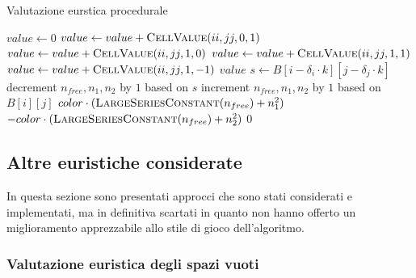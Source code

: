 \documentclass{article}
\begin{document}
\begin{algorithm}[H]
  \caption{Valutazione eurstica procedurale}
  \label{alg:eval}
  \begin{algorithmic}[0]
      \State $value \gets 0$
        \State $value \gets value + \Call{CellValue}{ii, jj, 0, 1}$
      \EndFor
        \State $value \gets value + \Call{CellValue}{ii, jj, 1, 0}$
      \EndFor
        \State $value \gets value + \Call{CellValue}{ii, jj, 1, 1}$
      \EndFor
        \State $value \gets value + \Call{CellValue}{ii, jj, 1, -1}$
      \EndFor
      \State \Return $value$
    \EndProcedure
    \Statex
       
        \State $s \gets B[i - \delta_i \cdot k][j - \delta_j \cdot k]$ 
        \State decrement $n_{free}, n_1, n_2$ by $1$ based on $s$
      \EndIf
      \State increment $n_{free}, n_1, n_2$ by $1$ based on $B[i][j]$
      \Statex
        \State \Return $color \cdot (\Call{LargeSeriesConstant}{n_{free}} + n_1^2)$
        \State \Return $-color \cdot (\Call{LargeSeriesConstant}{n_{free}} + n_2^2)$
      \Else
        \State \Return $0$
      \EndIf
    \EndProcedure
  \end{algorithmic}
\end{algorithm}

\subsection*{Altre euristiche considerate}

In questa sezione sono presentati approcci che sono stati considerati e
implementati, ma in definitiva scartati in quanto non hanno offerto un
miglioramento apprezzabile allo stile di gioco dell'algoritmo.

\subsubsection*{Valutazione euristica degli spazi vuoti}
\end{document}

